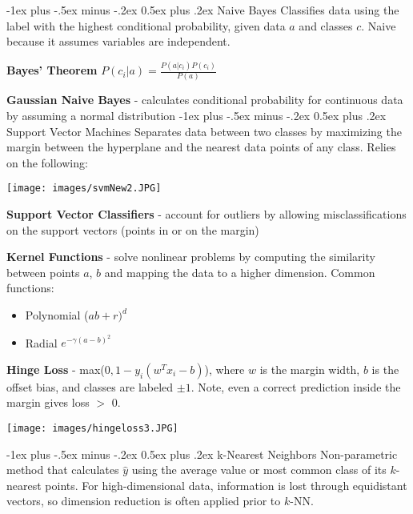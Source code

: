\documentclass[10pt,landscape]{article}
\makeatletter
\renewcommand{\section}{\@startsection{section}{1}{0mm}%
                                {-1ex plus -.5ex minus -.2ex}%
                                {0.5ex plus .2ex}%
                                {\normalfont\large\bfseries}}
\makeatother
\begin{document}
\begin{multicols}{3}
\section{Naive Bayes}
Classifies data using the label with the highest conditional probability, given data $a$ and classes $c$. Naive because it assumes variables are independent.

\textbf{Bayes' Theorem} $ P({c_i}|{a})  = \frac{P({a}|{c_i})P({c_i})}{P({a})}$

\textbf{Gaussian Naive Bayes} - calculates conditional probability for continuous data by assuming a normal distribution
\section{Support Vector Machines}
Separates data between two classes by maximizing the margin between the hyperplane and the nearest data points of any class. Relies on the following: 
\vspace{-2mm}
\begin{center}
    \texttt{[image: images/svmNew2.JPG]}
\end{center}
\vspace{-2mm}
\textbf{Support Vector Classifiers} - account for outliers by allowing misclassifications on the support vectors (points in or on the margin) 

\textbf{Kernel Functions} - solve nonlinear problems by computing the similarity between points $a$, $b$ and mapping the data to a higher dimension. Common functions:
\begin{itemize}[label={--},leftmargin=4mm]
\vspace{-1mm}
\itemsep -.4mm 
\item Polynomial ($ab + r)^d$
\item Radial $e^{-\gamma(a-b)^2}$
\end{itemize}

\textbf{Hinge Loss} - max($0,1-y_i(w^T x_i - b)$), where 
$w$ is the margin width, $b$ is the offset bias, and classes are labeled $\pm1$. Note, even a correct prediction inside the margin gives loss $>$ 0.
\vspace{-1mm}
\begin{center}
    \texttt{[image: images/hingeloss3.JPG]}
\end{center}
\vspace{-3.5mm}
\section{k-Nearest Neighbors}
Non-parametric method that calculates $\hat{y}$ using the average value or most common class of its $k$-nearest points. For high-dimensional data, information is lost through equidistant vectors, so dimension reduction is often applied prior to $k$-NN.


\end{multicols}
\end{document}

